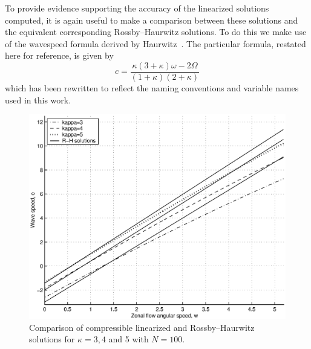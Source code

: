 To provide evidence supporting the accuracy of the linearized solutions computed, it is again useful to make a comparison between these solutions and the equivalent corresponding Rossby--Haurwitz solutions. To do this we make use of the wavespeed formula derived by Haurwitz~\cite{Haurwitz:MAD}. The particular formula, restated here for reference, is given by
\begin{equation}
c=\frac{\kappa(3+\kappa)\omega-2\Omega}{(1+\kappa)(2+\kappa)}
\end{equation}
which has been rewritten to reflect the naming conventions and variable names used in this work.
\begin{figure}[htbp]
	\centering
		\includegraphics[scale=0.7]{IMAGES/wvchconstcomp.eps}
	\caption{Comparison of compressible linearized and Rossby--Haurwitz solutions for $\kappa=3,4$ and 5 with $N=100$.}
	\label{fig:wvccomp}
\end{figure}
